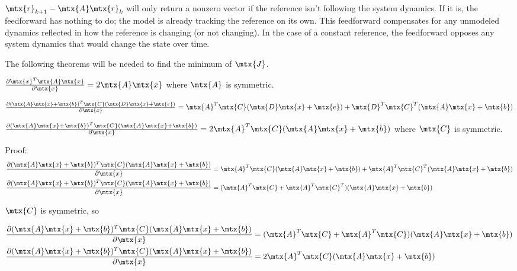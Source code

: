 \begin{remark}
  $\mtx{r}_{k+1} - \mtx{A}\mtx{r}_k$ will only return a nonzero vector if the
  \gls{reference} isn't following the \gls{system} dynamics. If it is, the
  feedforward has nothing to do; the \gls{model} is already tracking the
  \gls{reference} on its own. This feedforward compensates for any unmodeled
  dynamics reflected in how the \gls{reference} is changing (or not changing).
  In the case of a constant \gls{reference}, the feedforward opposes any
  \gls{system} dynamics that would change the \gls{state} over time.
\end{remark}

The following theorems will be needed to find the minimum of $\mtx{J}$.

\begin{theorem}
  \label{thm:partial_xax}

  $\frac{\partial \mtx{x}^T\mtx{A}\mtx{x}}{\partial\mtx{x}} =
    2\mtx{A}\mtx{x}$ where $\mtx{A}$ is symmetric.
\end{theorem}

\begin{theorem}
  \label{thm:partial_ax_b}

  $\frac{\partial (\mtx{A}\mtx{x} + \mtx{b})^T\mtx{C}
    (\mtx{D}\mtx{x} + \mtx{e})}{\partial\mtx{x}} =
    \mtx{A}^T\mtx{C}(\mtx{D}\mtx{x} + \mtx{e}) + \mtx{D}^T\mtx{C}^T
    (\mtx{A}\mtx{x} + \mtx{b})$
\end{theorem}

\begin{corollary}
  \label{cor:partial_ax_b}

  $\frac{\partial (\mtx{A}\mtx{x} + \mtx{b})^T\mtx{C}
    (\mtx{A}\mtx{x} + \mtx{b})}{\partial\mtx{x}} =
    2\mtx{A}^T\mtx{C}(\mtx{A}\mtx{x} + \mtx{b})$ where $\mtx{C}$ is symmetric.

  Proof:
  \begin{align*}
    \frac{\partial (\mtx{A}\mtx{x} + \mtx{b})^T\mtx{C}
      (\mtx{A}\mtx{x} + \mtx{b})}{\partial\mtx{x}} &=
      \mtx{A}^T\mtx{C}(\mtx{A}\mtx{x} + \mtx{b}) + \mtx{A}^T\mtx{C}^T
      (\mtx{A}\mtx{x} + \mtx{b}) \\
    \frac{\partial (\mtx{A}\mtx{x} + \mtx{b})^T\mtx{C}
      (\mtx{A}\mtx{x} + \mtx{b})}{\partial\mtx{x}} &=
      (\mtx{A}^T\mtx{C} + \mtx{A}^T\mtx{C}^T)(\mtx{A}\mtx{x} + \mtx{b})
  \end{align*}

  $\mtx{C}$ is symmetric, so

  \begin{align*}
    \frac{\partial (\mtx{A}\mtx{x} + \mtx{b})^T\mtx{C}
      (\mtx{A}\mtx{x} + \mtx{b})}{\partial\mtx{x}} &=
      (\mtx{A}^T\mtx{C} + \mtx{A}^T\mtx{C})(\mtx{A}\mtx{x} + \mtx{b}) \\
    \frac{\partial (\mtx{A}\mtx{x} + \mtx{b})^T\mtx{C}
      (\mtx{A}\mtx{x} + \mtx{b})}{\partial\mtx{x}} &=
      2\mtx{A}^T\mtx{C}(\mtx{A}\mtx{x} + \mtx{b})
  \end{align*}
\end{corollary}

